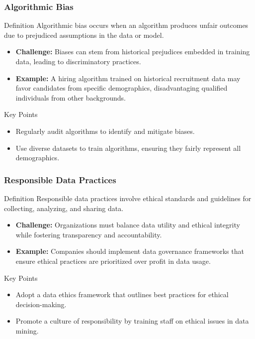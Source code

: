 \documentclass[aspectratio=169]{beamer}
\begin{document}
\begin{frame}[fragile]
    \frametitle{Algorithmic Bias}
    \begin{block}{Definition}
        Algorithmic bias occurs when an algorithm produces unfair outcomes due to prejudiced assumptions in the data or model.
    \end{block}

    \begin{itemize}
        \item \textbf{Challenge:} Biases can stem from historical prejudices embedded in training data, leading to discriminatory practices.
        \item \textbf{Example:} A hiring algorithm trained on historical recruitment data may favor candidates from specific demographics, disadvantaging qualified individuals from other backgrounds.
    \end{itemize}

    \begin{block}{Key Points}
        \begin{itemize}
            \item Regularly audit algorithms to identify and mitigate biases.
            \item Use diverse datasets to train algorithms, ensuring they fairly represent all demographics.
        \end{itemize}
    \end{block}
\end{frame}

\begin{frame}[fragile]
    \frametitle{Responsible Data Practices}
    \begin{block}{Definition}
        Responsible data practices involve ethical standards and guidelines for collecting, analyzing, and sharing data.
    \end{block}

    \begin{itemize}
        \item \textbf{Challenge:} Organizations must balance data utility and ethical integrity while fostering transparency and accountability.
        \item \textbf{Example:} Companies should implement data governance frameworks that ensure ethical practices are prioritized over profit in data usage.
    \end{itemize}

    \begin{block}{Key Points}
        \begin{itemize}
            \item Adopt a data ethics framework that outlines best practices for ethical decision-making.
            \item Promote a culture of responsibility by training staff on ethical issues in data mining.
        \end{itemize}
    \end{block}
\end{frame}
\end{document}
